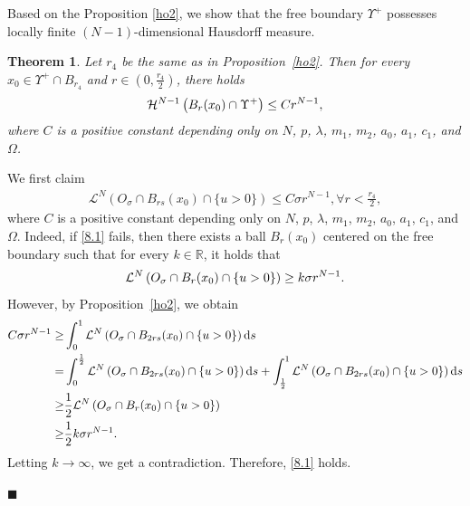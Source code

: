 \documentclass[onecolumn]{autart}
\newtheorem{theorem}{Theorem} %
\newenvironment{proof}{{\it Proof: \enspace}}{\hfill $\blacksquare$\par}
\begin{document}
	Based on the Proposition \ref{ho2}, we show that the free boundary $\Upsilon^+$ possesses locally finite $(N-1)$-dimensional Hausdorff measure.
	\begin{theorem} \label{ho}
		Let  $r_4$  be the same as in  Proposition~\ref{ho2}. Then  for every  $x_0 \in\Upsilon^+ \cap B_{r_4}$ {and $r \in \left( 0, \frac{r_4}{2}\right) $,} there holds
		\begin{align}
			\mathcal{H}^{N-1}\left( B_r(x_0) \cap \Upsilon^+\right)  \leq C r^{N-1},\notag
		\end{align}
		where $C$ is a positive constant depending only on  $N$, $p$, $\lambda$, $m_1$, $m_2$, $a_0$, $a_1$,   $c_1$,  and $\Omega$.
	\end{theorem}
	
	\begin{proof}
		We first claim
		\begin{align}\label{8.1}
			\mathcal{L}^N \left(  O_{\sigma}\cap B_{rs}(x_0)\cap\{u>0\}\right)  \leq C\sigma r^{N-1}, { \forall r < \frac{r_4}{2},}
		\end{align}
		where $C$ is a positive  constant  depending only on $N$, $p$, $\lambda$, $m_1$, $m_2$, $a_0$,   $a_1$,  $c_1$,  and $\Omega$. Indeed, if \eqref{8.1} fails, then there exists a ball $B_r(x_0)$ centered on the free boundary such that for every $k \in \mathbb{R}$, it holds that
		\begin{align}
			\mathcal{L}^N\left( O_\sigma \cap B_r(x_0) \cap \{ u > 0 \}\right)  \geq k \sigma r^{N-1}.\notag
		\end{align}
		However, by Proposition~\ref{ho2}, we obtain
		\begin{align}
			C \sigma r^{N-1}
			\geq
			& \int_0^1 \mathcal{L}^N\left( O_\sigma \cap B_{2rs}(x_0) \cap \{ u > 0 \}\right)  \mathrm{d}s
			\notag\\ =
			& \int_0^{\frac{1}{2}} \mathcal{L}^N\left( O_\sigma \cap B_{2rs}(x_0) \cap \{ u > 0 \}\right)  \mathrm{d}s
			+ \int_{\frac{1}{2}}^1 \mathcal{L}^N\left( O_\sigma \cap B_{2rs}(x_0) \cap \{ u > 0 \}\right)  \mathrm{d}s
			\notag\\\geq
			& \frac{1}{2} 	\mathcal{L}^N\left( O_\sigma \cap B_r(x_0) \cap \{ u > 0 \}\right)
			\notag\\ \geq
			& \frac{1}{2} k \sigma r^{N-1}.\notag
		\end{align}
		Letting $k \to \infty$, we get a contradiction. Therefore, \eqref{8.1} holds.
		

\end{proof}
\end{document}
